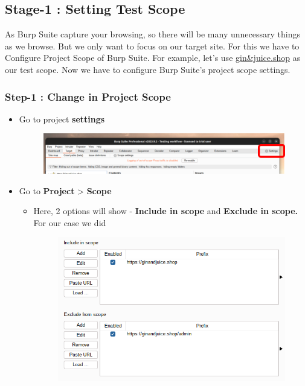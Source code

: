 \documentclass[
	a4paper, %
	12pt, %
]{CSSullivanBusinessReport}
\begin{document}
\subsection*{Stage-1 : Setting Test Scope}
\begin{fullwidth}
    As Burp Suite capture your browsing, so there will be many unnecessary things as we browse. But we only want to focus on our target site. For this we have to Configure Project Scope of Burp Suite.
\newline 
For example, let's use \href{https://ginandjuice.shop}{\color{orange}gin\&juice.shop} as our test scope. Now we have to configure Burp Suite's project scope settings. 


\subsubsection*{Step-1 : Change in Project Scope}
\begin{itemize}
	\item Go to project \textbf{settings}
\begin{figure}[H]
    \centering
    \includegraphics[width=1\linewidth]{Images//Setting Test Scope/settings.png}
    
    
\end{figure}
	\item Go to {\color{orange}\textbf{Project}} > {\color{orange}\textbf{Scope}}
            \begin{itemize}
                \item Here, 2 options will show - \textbf{Include in scope} and \textbf{Exclude in scope.} For our case we did
\begin{figure}[H]
    \centering
    \includegraphics[width=1\linewidth]{Images/Setting Test Scope/scope_site.png}    
\end{figure}
            \end{itemize}	


\end{itemize}
\end{fullwidth}
\end{document}
